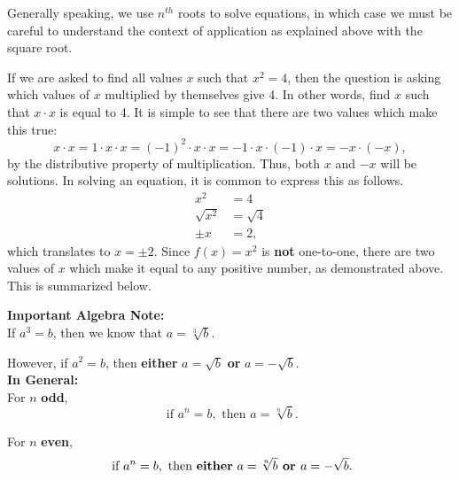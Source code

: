 \documentclass{ximera}
\begin{document}
Generally speaking, we use $n^{th}$ roots to solve equations, in which case we must be careful to understand the context of application as explained above with the square root.

If we are asked to find all values $x$ such that $x^2=4$, then the question is asking which values of $x$ multiplied by themselves give 4. In other words, find $x$ such that $x \cdot x$ is equal to 4. It is simple to see that there are two values which make this true:
$$x\cdot x = 1\cdot x \cdot x = (-1)^2 \cdot x \cdot x = -1 \cdot x \cdot (-1)\cdot x = -x \cdot (-x),$$
by the distributive property of multiplication. Thus, both $x$ and $-x$ will be solutions. In solving an equation, it is common to express this as follows.
\begin{align*}
x^2 &= 4 \\
\sqrt{x^2} &= \sqrt{4} \\
\pm x &= 2,
\end{align*}
which translates to $x = \pm 2$. %
Since $f(x)=x^2$ is \textbf{not} one-to-one, there are two values of $x$ which make it equal to any positive number, as demonstrated above.
This is summarized below.

\begin{callout}
{\bf Important Algebra Note:}\\
If $a^3=b$, then we know that $a = \sqrt[3]{b}$.

However, if $a^2 =b$, then {\bf either} $a=\sqrt{b}$ {\bf or} $a = -\sqrt{b}$.
\\

{\bf In General:}\\
For $n$ {\bf odd}, 
$$\text{ if } a^n = b, \text{ then } a=\sqrt[n]{b}.$$

For $n$ {\bf even},
$$\text{ if } a^n = b, \text{ then {\bf either} } a=\sqrt[n]{b} \textbf{ or } a = -\sqrt{b}.$$

\end{callout}
\end{document}

